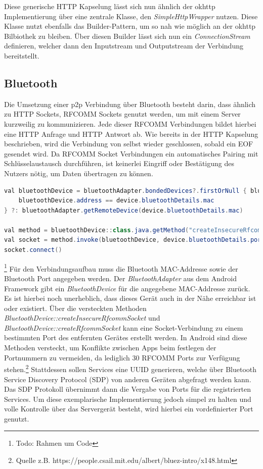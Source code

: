 \documentclass[12pt,a4paper]{article}
\begin{document}
        
        Diese generische HTTP Kapselung lässt sich nun ähnlich der okhttp Implementierung über eine zentrale Klasse, den {\it SimpleHttpWrapper} nutzen. Diese Klasse nutzt ebenfalls das Builder-Pattern, um so nah wie möglich an der okhttp Bilbiothek zu bleiben. Über diesen Builder lässt sich nun ein {\it ConnectionStream} definieren, welcher dann den Inputstream und Outputstream der Verbindung bereitstellt.
        
        \subsection{Bluetooth}
        Die Umsetzung einer p2p Verbindung über Bluetooth besteht darin, dass ähnlich zu HTTP Sockets, RFCOMM Sockets genutzt werden, um mit einem Server kurzweilig zu kommunizieren. Jede dieser RFCOMM Verbindungen bildet hierbei eine HTTP Anfrage und HTTP Antwort ab. Wie bereits in der HTTP Kapselung beschrieben, wird die Verbindung von selbst wieder geschlossen, sobald ein EOF gesendet wird. Da RFCOMM Socket Verbindungen ein automatisches Pairing mit Schlüsselaustausch durchführen, ist keinerlei Eingriff oder Bestätigung des Nutzers nötig, um Daten übertragen zu können.
        \begin{lstlisting}[language=Java, caption=Verbindungsaufbau mit Bluetooth (Client: Kotlin)]
val bluetoothDevice = bluetoothAdapter.bondedDevices?.firstOrNull { bluetoothDevice ->
    bluetoothDevice.address == device.bluetoothDetails.mac
} ?: bluetoothAdapter.getRemoteDevice(device.bluetoothDetails.mac)

val method = bluetoothDevice::class.java.getMethod("createInsecureRfcommSocket", Int::class.javaPrimitiveType)
val socket = method.invoke(bluetoothDevice, device.bluetoothDetails.port) as BluetoothSocket
socket.connect()
        \end{lstlisting}\footnote{Todo: Rahmen um Code}
        Für den Verbindungsaufbau muss die Bluetooth MAC-Addresse sowie der Bluetooth Port angegeben werden. Der {\it BluetoothAdapter} aus dem Android Framework gibt ein {\it BluetoothDevice} für die angegebene MAC-Addresse zurück. Es ist hierbei noch unerheblich, dass dieses Gerät auch in der Nähe erreichbar ist oder existiert. Über die versteckten Methoden {\it BluetoothDevice::createInsecureRfcommSocket} und {\it BluetoothDevice::createRfcommSocket} kann eine Socket-Verbindung zu einem bestimmten Port des entfernten Gerätes erstellt werden. In Android sind diese Methoden versteckt, um Konflikte zwischen Apps beim festlegen der Portnummern zu vermeiden, da lediglich 30 RFCOMM Ports zur Verfügung stehen.\footnote{Quelle z.B. https://people.csail.mit.edu/albert/bluez-intro/x148.html} Stattdessen sollen Services eine UUID generieren, welche über Bluetooth Service Discovery Protocol (SDP) von anderen Geräten abgefragt werden kann. Das SDP Protokoll übernimmt dann die Vergabe von Ports für die registrierten Services. Um diese exemplarische Implementierung jedoch simpel zu halten und volle Kontrolle über das Servergerät besteht, wird hierbei ein vordefinierter Port genutzt.
\end{document}
